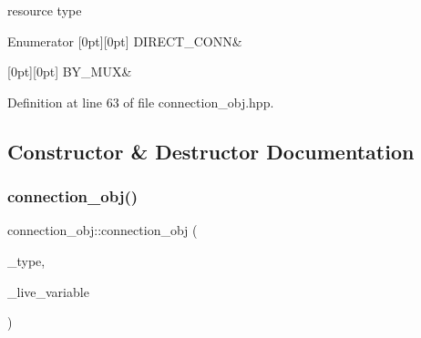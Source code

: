 resource type 

\begin{DoxyEnumFields}{Enumerator}
[0pt][0pt]{}\mbox{\label{classconnection__obj_a28fc8ddc2893b5ef328f75147a18f6c6ada70362adea175330d0066a4ac6662c8}} 
D\+I\+R\+E\+C\+T\+\_\+\+C\+O\+NN&\\
\hline

[0pt][0pt]{}\mbox{\label{classconnection__obj_a28fc8ddc2893b5ef328f75147a18f6c6a6f6d564b6b69a297329a6aec63523802}} 
B\+Y\+\_\+\+M\+UX&\\
\hline

\end{DoxyEnumFields}


Definition at line 63 of file connection\+\_\+obj.\+hpp.



\subsection{Constructor \& Destructor Documentation}
\mbox{\label{classconnection__obj_aa47e65d4e7d00196b141a7213b020896}} 
\subsubsection{\texorpdfstring{connection\+\_\+obj()}{connection\_obj()}}
{\footnotesize\ttfamily connection\+\_\+obj\+::connection\+\_\+obj (\begin{DoxyParamCaption}\item[{\hyperlink{classconnection__obj_a28fc8ddc2893b5ef328f75147a18f6c6}{element\+\_\+t}}]{\+\_\+type,  }\item[{\hyperlink{classCustomOrderedSet}{Custom\+Ordered\+Set}$<$ \hyperlink{conn__binding_8hpp_ae44ffa64566f2bb3ce6941833ac940fb}{data\+\_\+transfer} $>$}]{\+\_\+live\+\_\+variable }\end{DoxyParamCaption})\hspace{0.3cm}{\ttfamily [inline]}}



